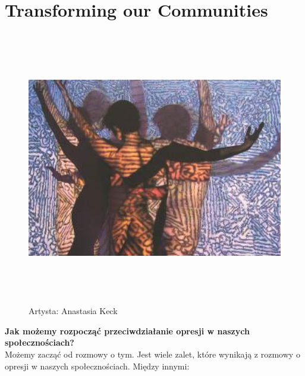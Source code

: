 \chapter{Transforming our Communities}


\begin{figure}[h]
	\centering
	\includegraphics[height=12cm]{TeX_files/4-0.png}
	\caption{Artysta: Anastasia Keck}
	\label{2-0}
\end{figure}

\noindent\textcolor{ProcessBlue}{\textbf{\LARGE{Jak możemy rozpocząć przeciwdziałanie opresji w naszych społecznościach?}}}\\

Możemy zacząć od rozmowy o tym. Jest wiele zalet, które wynikają z rozmowy o opresji w naszych społecznościach. Między innymi:

